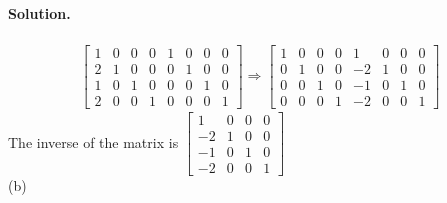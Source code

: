 \paragraph*{Solution.}
\begin{align*}
    \left[\begin{array}{cccc|cccc}
        1&0&0&0&1&0&0&0\\
        2&1&0&0&0&1&0&0\\
        1&0&1&0&0&0&1&0\\
        2&0&0&1&0&0&0&1
    \end{array}\right]\Rightarrow\left[\begin{array}{cccc|cccc}
        1&0&0&0&1&0&0&0\\
        0&1&0&0&-2&1&0&0\\
        0&0&1&0&-1&0&1&0\\
        0&0&0&1&-2&0&0&1
    \end{array}\right]
\end{align*}
The inverse of the matrix is $\begin{bmatrix}
    1&0&0&0\\-2&1&0&0\\-1&0&1&0\\-2&0&0&1
\end{bmatrix}$\\

(b)
